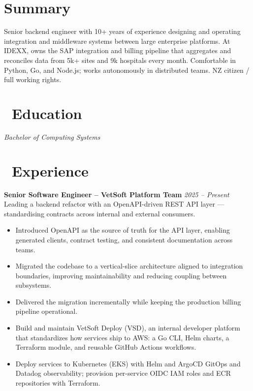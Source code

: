 \documentclass{resume}
\begin{document}


  \vspace{2em}

\section*{Summary}
Senior backend engineer with 10+ years of experience designing and operating integration and middleware systems between large enterprise platforms. At IDEXX, owns the SAP integration and billing pipeline that aggregates and reconciles data from 5k+ sites and 9k hospitals every month. Comfortable in Python, Go, and Node.js; works autonomously in distributed teams. NZ citizen / full working rights.

\section{\faGraduationCap\ Education}
\textit{Bachelor of Computing Systems}


\section{\faUsers\ Experience}
\vspace{1em}
\textbf{Senior Software Engineer – VetSoft Platform Team} \hfill \textit{2025 -- Present} \\
Leading a backend refactor with an OpenAPI-driven REST API layer — standardising contracts across internal and external consumers.
\begin{itemize}
  \item Introduced OpenAPI as the source of truth for the API layer, enabling generated clients, contract testing, and consistent documentation across teams.
  \item Migrated the codebase to a vertical-slice architecture aligned to integration boundaries, improving maintainability and reducing coupling between subsystems.
  \item Delivered the migration incrementally while keeping the production billing pipeline operational.
  \item Build and maintain VetSoft Deploy (VSD), an internal developer platform that standardizes how services ship to AWS: a Go CLI, Helm charts, a Terraform module, and reusable GitHub Actions workflows.
  \item Deploy services to Kubernetes (EKS) with Helm and ArgoCD GitOps and Datadog observability; provision per-service OIDC IAM roles and ECR repositories with Terraform.
\end{itemize}
\end{document}
